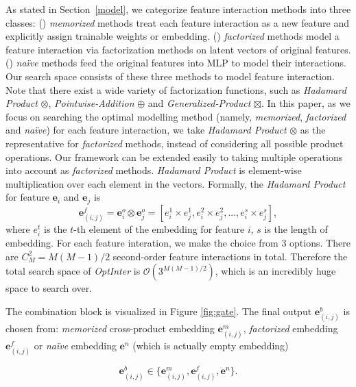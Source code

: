 \documentclass[conference]{IEEEtran}
\begin{document}
As stated in Section~\ref{model}, we categorize feature interaction methods into three classes: () \emph{memorized} methods treat each feature interaction as a new feature and explicitly assign trainable weights or embedding. () \emph{factorized} methods model a feature interaction via factorization methods on latent vectors of original features. () \emph{naïve} methods feed the original features into MLP to model their interactions. Our search space consists of these three methods to model feature interaction. Note that there exist a wide variety of factorization functions, such as \textit{Hadamard Product} $\otimes$, \textit{Pointwise-Addition} $\oplus$ and \textit{Generalized-Product} $\boxtimes$.
In this paper, as we focus on searching the optimal modelling method (namely, \emph{memorized}, \emph{factorized} and \emph{naïve}) for each feature interaction, we take \textit{Hadamard Product} $\otimes$ as the representative for \emph{factorized} methods, instead of considering all possible product operations. Our framework can be extended easily to taking multiple operations into account as \emph{factorized} methods. \textit{Hadamard Product} is element-wise multiplication over each element in the vectors. Formally, the \textit{Hadamard Product} for feature $\mathbf{e}_i$ and $\mathbf{e}_j$ is
\begin{equation}
    \mathbf{e}^{f}_{(i,j)} = \mathbf{e}^{o}_i \otimes \mathbf{e}^{o}_j = [e^1_i \times e^1_j, e^2_i \times e^2_j, ..., e^s_i \times e^s_j],
\end{equation}
where $e^t_i$ is the $t$-th element of the embedding for feature $i$, $s$ is the length of embedding. For each feature interation, we make the choice from 3 options. There are $C_M^2 = M(M-1)/2$ second-order feature interactions in total. Therefore the total search space of \textit{OptInter} is $\mathcal{O}(3^{M(M-1)/2})$, which is an incredibly huge space to search over.

The combination block is visualized in Figure \ref{fig:gate}. The final output $\mathbf{e}^{b}_{(i,j)}$ is chosen from: \emph{memorized} cross-product embedding $\mathbf{e}^{m}_{(i,j)}$, \emph{factorized}  embedding $\mathbf{e}^{f}_{(i,j)}$ or \emph{naïve} embedding $\mathbf{e}^{n}$ (which is actually empty embedding)

\begin{equation}
    \mathbf{e}^{b}_{(i,j)} \in \{\mathbf{e}^{m}_{(i,j)}, \mathbf{e}^{f}_{(i,j)}, \mathbf{e}^{n}\}.
\end{equation}
\end{document}
